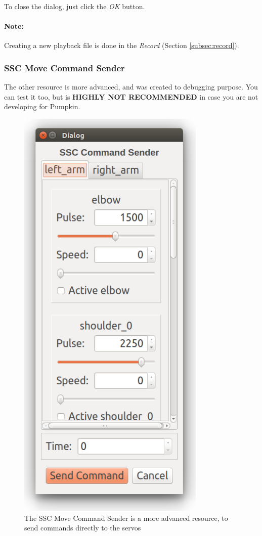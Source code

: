 \documentclass[oneside,a4paper,titlepage]{article}
\begin{document}
To close the dialog, just click the \emph{OK} button.

\paragraph{Note: } Creating a new playback file is done in the \emph{Record} (Section \ref{subsec:record}).

\subsubsection{SSC Move Command Sender}

The other resource is more advanced, and was created to debugging purpose. You can test it too, but is \textbf{\color{red} HIGHLY NOT RECOMMENDED} in case you are not developing for Pumpkin.

\begin{figure}[ht!]
	\centering
	\includegraphics[width=0.8\textwidth]{ssc}
	\caption[SSC Move Command Sender]{The SSC Move Command Sender is a more advanced resource, to send commands directly to the servos}
	\label{fig:ssc}
\end{figure}
\end{document}
